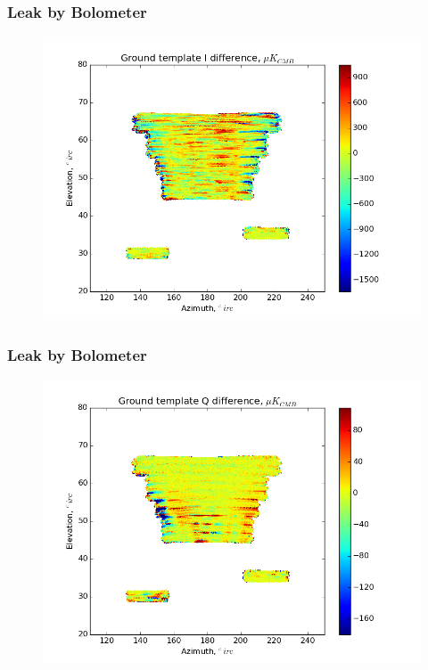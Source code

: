 \documentclass{beamer}
\begin{document}
\begin{frame}
\frametitle{Leak by Bolometer}
\begin{figure}
\includegraphics[width=0.9\linewidth]{dI_gt_LEAK_BY_BOLO.png}
\end{figure}
\end{frame}

\begin{frame}
\frametitle{Leak by Bolometer}
\begin{figure}
\includegraphics[width=0.9\linewidth]{dQ_gt_LEAK_BY_BOLO.png}
\end{figure}
\end{frame}
\end{document}
